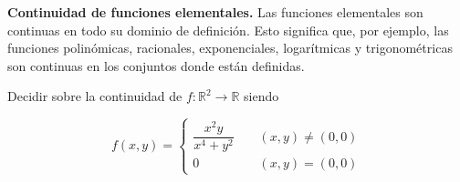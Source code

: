 \begin{propertie} \label{prop:cont_elem} \textbf{Continuidad de funciones elementales.}
Las funciones elementales son continuas en todo su dominio de definici\'on. Esto significa que, por ejemplo, las funciones polinómicas, racionales, exponenciales, logarítmicas y trigonométricas son continuas en los conjuntos donde están definidas. 
\end{propertie}


\begin{tarea}\label{direccionales}
Decidir sobre la continuidad de $f:\mathbb{R}^{2}\rightarrow\mathbb{R}$ siendo

\begin{equation*}
f(x,y)=\left\{\begin{array}{cc} 
\dfrac{x^{2}y}{x^4+y^{2}} & \;\;\;\; (x,y) \neq (0,0) \\[1em]
0 & \;\;\;\; (x,y)=(0,0)
\end{array}\right.
\end{equation*}
\end{tarea}



  
 